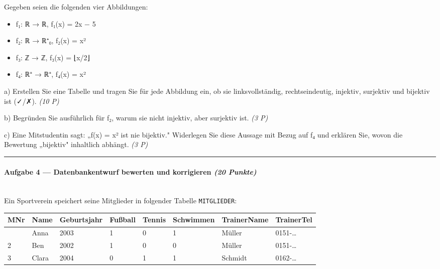 \documentclass[11pt, a4paper]{article}
\begin{document}
Gegeben seien die folgenden vier Abbildungen:


\begin{itemize}
  \item f₁: ℝ → ℝ, f₁(x) = 2x − 5
  \item f₂: ℝ → ℝ⁺₀, f₂(x) = x²
  \item f₃: ℤ → ℤ, f₃(x) = ⌊x/2⌋
  \item f₄: ℝ⁺ → ℝ⁺, f₄(x) = x²
\end{itemize}

a) Erstellen Sie eine Tabelle und tragen Sie für jede Abbildung ein, ob sie linksvollständig, rechtseindeutig, injektiv, surjektiv und bijektiv ist (✓/✗). \textit{(10 P)}


b) Begründen Sie ausführlich für f₂, warum sie nicht injektiv, aber surjektiv ist. \textit{(3 P)}


c) Eine Mitstudentin sagt: „f(x) = x² ist nie bijektiv." Widerlegen Sie diese Aussage mit Bezug auf f₄ und erklären Sie, wovon die Bewertung „bijektiv" inhaltlich abhängt. \textit{(3 P)}



\noindent\textcolor{rulegray}{\rule{\linewidth}{0.4pt}}


\paragraph{Aufgabe 4 — Datenbankentwurf bewerten und korrigieren \textit{(20 Punkte)}}\mbox{}\\[2pt]

Ein Sportverein speichert seine Mitglieder in folgender Tabelle \texttt{MITGLIEDER}:



\begin{landscape}

{\footnotesize
\begin{tabularx}{\linewidth}{XXXXXXXX}
\hline
\rowcolor{tableheadbg}
{\color{white}\textbf{MNr}} & {\color{white}\textbf{Name}} & {\color{white}\textbf{Geburtsjahr}} & {\color{white}\textbf{Fußball}} & {\color{white}\textbf{Tennis}} & {\color{white}\textbf{Schwimmen}} & {\color{white}\textbf{TrainerName}} & {\color{white}\textbf{TrainerTel}} \\[2pt]
\hline
\endhead
\hline
\endfoot
1 & Anna & 2003 & 1 & 0 & 1 & Müller & 0151-… \\
2 & Ben & 2002 & 1 & 0 & 0 & Müller & 0151-… \\
3 & Clara & 2004 & 0 & 1 & 1 & Schmidt & 0162-… \\
\end{tabularx}
}
\end{landscape}
\end{document}
